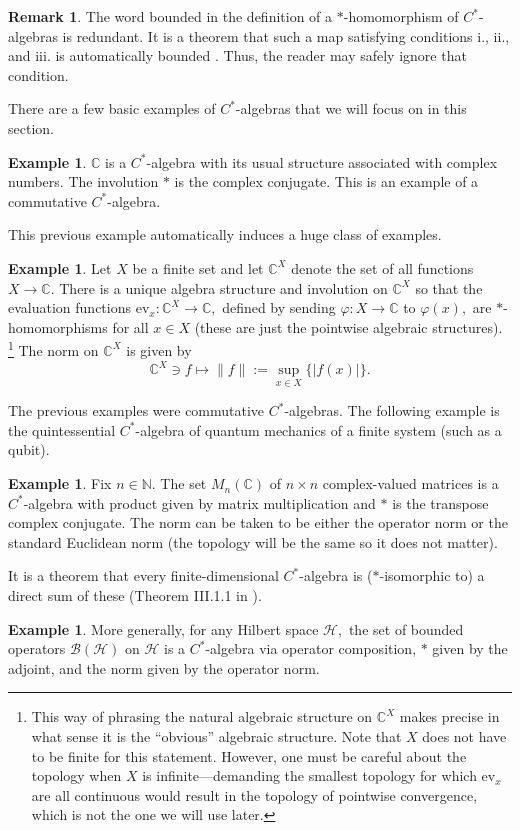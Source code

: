 \documentclass[12pt]{article}
\theoremstyle{theorem}
\theoremstyle{definition}
\newtheorem{example}[equation]{Example}
\newtheorem{remark}[equation]{Remark}
\numberwithin{equation}{section}
\let\C=\Chi \let\W=\Omega
\def\vf{\varphi}
\newcommand{\be}{\begin{equation}}
\newcommand{\ee}{\end{equation}}
\newcommand{\bx}{\begin{example}}
\newcommand{\ex}{\end{example}}
\newcommand{\br}{\begin{remark}}
\newcommand{\er}{\end{remark}}
\newcommand{\<}{\langle}
\renewcommand{\>}{\rangle}
\def\ev{{{\mathrm{ev}}}}
\def\C{{{\mathbb C}}}
\def\N{{{\mathbb N}}}
\def\Hi{{{\mathcal{H}}}}
\def\mB{{{\mathcal{B}}}}
\begin{document}
\br
The word bounded in the definition of a $*$-homomorphism
of $C^*$-algebras is redundant. 
It is a theorem that such a map satisfying
conditions i., ii., and iii. is automatically bounded \cite{Di77}.
Thus, the reader may safely ignore that condition. 
\er

There are a few basic examples of $C^*$-algebras that we will focus on in 
this section.
\bx
$\C$ is a $C^*$-algebra with its usual structure associated with
complex numbers.
The involution $*$ is the complex conjugate. 
This is an example of a commutative $C^*$-algebra.
\ex

This previous example automatically induces a huge class
of examples. 

\bx
\label{ex:CXalgebra}
Let $X$ be a finite set and let $\C^{X}$ denote the set of all
functions $X\to\C.$ There is a unique algebra structure and involution
on $\C^{X}$ so that the evaluation functions $\ev_{x}:\C^{X}\to\C,$
defined by sending $\vf:X\to\C$ to $\vf(x),$
are $*$-homomorphisms for all $x\in X$
(these are just the pointwise algebraic structures).%
\footnote{This way of phrasing the natural algebraic structure on $\C^{X}$ 
makes precise in what sense it is the ``obvious'' algebraic structure.
Note that $X$ does not have to be finite for this statement. 
However, one must be careful about the topology when $X$ is 
infinite---demanding the smallest topology for which $\ev_{x}$
are all continuous would result in the topology of pointwise convergence, 
which is not the one we will use later. 
}
The norm on $\C^{X}$ is given by 
\be
\C^{X}\ni f\mapsto \lVert f\rVert:=\sup_{x\in X}\{|f(x)|\}.
\ee
\ex

The previous examples were commutative $C^*$-algebras. 
The following example is the quintessential $C^*$-algebra
of quantum mechanics of a finite system (such as a qubit).

\bx
\label{ex:nbybmatrices}
Fix $n\in\N.$ The set $M_{n}(\C)$ 
of $n\times n$ complex-valued matrices is a $C^*$-algebra with 
product given by matrix multiplication and $*$ is the transpose
complex conjugate. The norm can be taken to be
either the operator norm or the standard Euclidean norm 
(the topology will be the same so it does not matter). 
\ex

It is a theorem that every finite-dimensional $C^*$-algebra
is ($*$-isomorphic to) a direct sum of these (Theorem III.1.1 in \cite{Da96}).

\bx
More generally, for any
Hilbert space $\Hi,$ the set of bounded operators $\mB(\Hi)$ on
$\Hi$ is a $C^*$-algebra via operator composition, $*$ given by the adjoint, 
and the norm given by the operator norm. 
\ex
\end{document}
